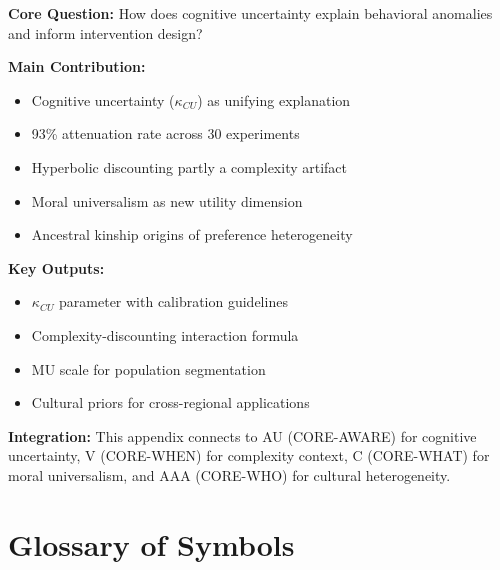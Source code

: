 \begin{tcolorbox}[colback=green!10!white, colframe=green!75!black,
    title=\textbf{Appendix ENK: Summary}]

\textbf{Core Question:} How does cognitive uncertainty explain behavioral
anomalies and inform intervention design?

\textbf{Main Contribution:}
\begin{itemize}[nosep]
    \item Cognitive uncertainty ($\kappa_{CU}$) as unifying explanation
    \item 93\% attenuation rate across 30 experiments
    \item Hyperbolic discounting partly a complexity artifact
    \item Moral universalism as new utility dimension
    \item Ancestral kinship origins of preference heterogeneity
\end{itemize}

\textbf{Key Outputs:}
\begin{itemize}[nosep]
    \item $\kappa_{CU}$ parameter with calibration guidelines
    \item Complexity-discounting interaction formula
    \item MU scale for population segmentation
    \item Cultural priors for cross-regional applications
\end{itemize}

\textbf{Integration:} This appendix connects to AU (CORE-AWARE) for cognitive
uncertainty, V (CORE-WHEN) for complexity context, C (CORE-WHAT) for moral
universalism, and AAA (CORE-WHO) for cultural heterogeneity.

\end{tcolorbox}


\section{Glossary of Symbols}
\label{sec:enk-glossary}

